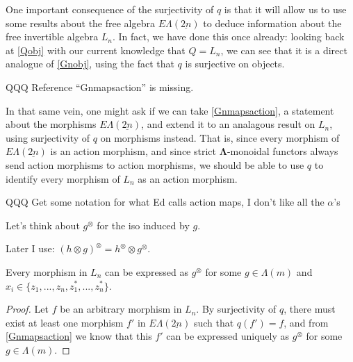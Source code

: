 \documentclass{amsbook} %
\newcommand{\ML}{\mathbf{\Lambda}}
\newcommand{\ELnn}{E\Lambda(\underline{2n})}
\newenvironment{eq*}{\begin{equation*}}{\end{equation*}}
\numberwithin{section}{chapter}
\begin{document}
One important consequence of the surjectivity of $q$ is that it will allow us to use some results about the free algebra $\ELnn$ to deduce information about the free invertible algebra $L_n$. In fact, we have done this once already: looking back at \cref{Qobj} with our current knowledge that $Q = L_n$, we can see that it is a direct analogue of \cref{Gnobj}, using the fact that $q$ is surjective on objects. 


QQQ Reference ``Gnmapsaction'' is missing.


In that same vein, one might ask if we can take \cref{Gnmapsaction}, a statement about the morphisms $\ELnn$, and extend it to an analagous result on $L_n$, using surjectivity of $q$ on morphisms instead. That is, since every morphism of $\ELnn$ is an action morphism, and since strict $\ML$-monoidal functors always send action morphisms to action morphisms, we should be able to use $q$ to identify every morphism of $L_n$ as an action morphism. 


QQQ Get some notation for what Ed calls action maps, I don't like all the $\alpha$'s

\begin{nota}\label{newaction}
Let's think about $g^{\otimes}$ for the iso induced by $g$.
\end{nota}

\begin{lem}\label{otimesotimes}
Later I use: $(h \otimes g)^{\otimes} = h^{\otimes} \otimes g^{\otimes}$.
\end{lem}

\begin{lem} \label{allmapsaction} Every morphism in $L_n$ can be expressed as $g^{\otimes}$
for some $g \in \Lambda(m)$ and $x_i \in \{z_1, ..., z_n, z_1^*, ..., z_n^* \}$.
\end{lem}
\begin{proof}
Let $f$ be an arbitrary morphism in $L_n$. By surjectivity of $q$, there must exist at least one morphism $f'$ in $\ELnn$ such that $q(f') = f$, and from \cref{Gnmapsaction} we know that this $f'$ can be expressed uniquely as $g^{\otimes}$ for some $g \in \Lambda(m)$. %
\end{proof}
\end{document}

